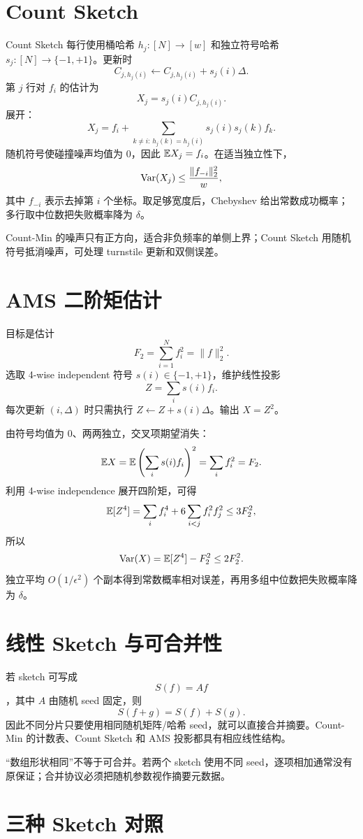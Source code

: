 \section{Count Sketch}

Count Sketch 每行使用桶哈希 $h_j:[N]\to[w]$ 和独立符号哈希 $s_j:[N]\to\{-1,+1\}$。更新时
\[
C_{j,h_j(i)}\leftarrow C_{j,h_j(i)}+s_j(i)\Delta.
\]
第 $j$ 行对 $f_i$ 的估计为
\[
X_j=s_j(i)C_{j,h_j(i)}.
\]
展开：
\[
X_j=f_i+
\sum_{k\ne i:\,h_j(k)=h_j(i)}s_j(i)s_j(k)f_k.
\]
随机符号使碰撞噪声均值为 0，因此 $\mathbb{E} X_j=f_i$。在适当独立性下，
\[
\operatorname{Var}(X_j)
\le\frac{\|f_{-i}\|_2^2}{w},
\]
其中 $f_{-i}$ 表示去掉第 $i$ 个坐标。取足够宽度后，Chebyshev 给出常数成功概率；多行取中位数把失败概率降为 $\delta$。

Count-Min 的噪声只有正方向，适合非负频率的单侧上界；Count Sketch 用随机符号抵消噪声，可处理 turnstile 更新和双侧误差。

\section{AMS 二阶矩估计}

目标是估计
\[
F_2=\sum_{i=1}^Nf_i^2=\|f\|_2^2.
\]
选取 4-wise independent 符号 $s(i)\in\{-1,+1\}$，维护线性投影
\[
Z=\sum_i s(i)f_i.
\]
每次更新 $(i,\Delta)$ 时只需执行 $Z\leftarrow Z+s(i)\Delta$。输出 $X=Z^2$。

由符号均值为 0、两两独立，交叉项期望消失：
\[
\mathbb{E} X
=\mathbb{E}\left(\sum_is(i)f_i\right)^2
=\sum_if_i^2=F_2.
\]
利用 4-wise independence 展开四阶矩，可得
\[
\mathbb{E}[Z^4]
=\sum_if_i^4+6\sum_{i<j}f_i^2f_j^2
\le3F_2^2,
\]
所以
\[
\operatorname{Var}(X)=\mathbb{E}[Z^4]-F_2^2\le2F_2^2.
\]
独立平均 $O(1/\epsilon^2)$ 个副本得到常数概率相对误差，再用多组中位数把失败概率降为 $\delta$。

\section{线性 Sketch 与可合并性}

若 sketch 可写成
\[
S(f)=Af
\]
，其中 $A$ 由随机 seed 固定，则
\[
S(f+g)=S(f)+S(g).
\]
因此不同分片只要使用相同随机矩阵/哈希 seed，就可以直接合并摘要。Count-Min 的计数表、Count Sketch 和 AMS 投影都具有相应线性结构。

\begin{warningbox}
“数组形状相同”不等于可合并。若两个 sketch 使用不同 seed，逐项相加通常没有原保证；合并协议必须把随机参数视作摘要元数据。
\end{warningbox}

\section{三种 Sketch 对照}

